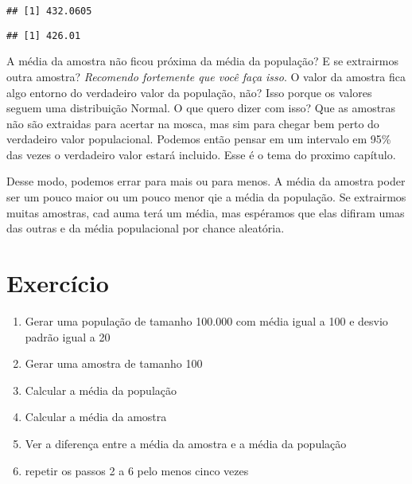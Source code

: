 \documentclass[]{book}
\newenvironment{Shaded}{\begin{snugshade}}{\end{snugshade}}
\newcommand{\KeywordTok}[1]{\textcolor[rgb]{0.13,0.29,0.53}{\textbf{#1}}}
\newcommand{\OperatorTok}[1]{\textcolor[rgb]{0.81,0.36,0.00}{\textbf{#1}}}
\newcommand{\NormalTok}[1]{#1}
\providecommand{\tightlist}{%
  \setlength{\itemsep}{0pt}\setlength{\parskip}{0pt}}
\theoremstyle{definition}
\theoremstyle{definition}
\theoremstyle{definition}
\theoremstyle{remark}
\begin{document}
\begin{verbatim}
## [1] 432.0605
\end{verbatim}

\begin{Shaded}
\end{Shaded}

\begin{verbatim}
## [1] 426.01
\end{verbatim}

A média da amostra não ficou próxima da média da população? E se
extrairmos outra amostra? \emph{Recomendo fortemente que você faça
isso}. O valor da amostra fica algo entorno do verdadeiro valor da
população, não? Isso porque os valores seguem uma distribuição Normal. O
que quero dizer com isso? Que as amostras não são extraidas para acertar
na mosca, mas sim para chegar bem perto do verdadeiro valor
populacional. Podemos então pensar em um intervalo em 95\% das vezes o
verdadeiro valor estará incluido. Esse é o tema do proximo capítulo.

Desse modo, podemos errar para mais ou para menos. A média da amostra
poder ser um pouco maior ou um pouco menor qie a média da população. Se
extrairmos muitas amostras, cad auma terá um média, mas espéramos que
elas difiram umas das outras e da média populacional por chance
aleatória.

\section{Exercício}\label{exercicio}

\begin{enumerate}
\def\labelenumi{\arabic{enumi}.}
\tightlist
\item
  Gerar uma população de tamanho 100.000 com média igual a 100 e desvio
  padrão igual a 20
\item
  Gerar uma amostra de tamanho 100
\item
  Calcular a média da população
\item
  Calcular a média da amostra
\item
  Ver a diferença entre a média da amostra e a média da população
\item
  repetir os passos 2 a 6 pelo menos cinco vezes
\end{enumerate}
\end{document}
